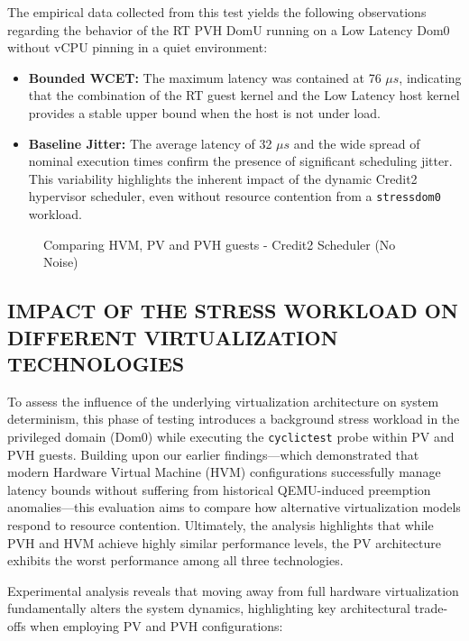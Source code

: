 The empirical data collected from this test yields the following
observations regarding the behavior of the RT PVH DomU running on a Low
Latency Dom0 without vCPU pinning in a quiet environment:

\begin{itemize}
\item
  \textbf{Bounded WCET:} The maximum latency was contained at 76 $\mu s$,
  indicating that the combination of the RT guest kernel and the Low
  Latency host kernel provides a stable upper bound when the host is not
  under load.
\item
  \textbf{Baseline Jitter:} The average latency of 32 $\mu s$ and the wide
  spread of nominal execution times confirm the presence of significant
  scheduling jitter. This variability highlights the inherent impact of
  the dynamic Credit2 hypervisor scheduler, even without resource
  contention from a \texttt{stressdom0} workload.
\end{itemize}

\begin{figure}
\centering

\caption{Comparing HVM, PV and PVH guests - Credit2 Scheduler (No
Noise)}
\end{figure}

\subsection{IMPACT OF THE STRESS WORKLOAD ON DIFFERENT VIRTUALIZATION
TECHNOLOGIES}\label{impact-of-the-stress-workload-on-different-virtualization-technologies}

To assess the influence of the underlying virtualization architecture on
system determinism, this phase of testing introduces a background stress
workload in the privileged domain (Dom0) while executing the
\texttt{cyclictest} probe within PV and PVH guests. Building upon our
earlier findings---which demonstrated that modern Hardware Virtual
Machine (HVM) configurations successfully manage latency bounds without
suffering from historical QEMU-induced preemption anomalies---this
evaluation aims to compare how alternative virtualization models respond
to resource contention. Ultimately, the analysis highlights that while
PVH and HVM achieve highly similar performance levels, the PV
architecture exhibits the worst performance among all three
technologies.

Experimental analysis reveals that moving away from full hardware
virtualization fundamentally alters the system dynamics, highlighting
key architectural trade-offs when employing PV and PVH configurations:

